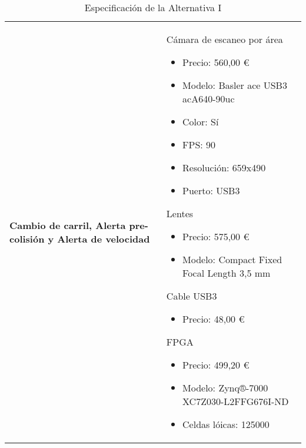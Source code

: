 \begin{table}[H]
\begin{center}
\begin{tabular}{p{5cm} p{8cm}}
\\ \hline

\textbf{Cambio de carril, Alerta pre-colisión y Alerta de velocidad} &
Cámara de escaneo por área
\begin{itemize}
    \item Precio: 560,00 \euro
    \item Modelo: Basler ace USB3 acA640-90uc
    \item Color: Sí
    \item FPS: 90
    \item Resolución: 659x490
    \item Puerto: USB3
\end{itemize}
Lentes
\begin{itemize}
    \item Precio: 575,00 \euro
    \item Modelo: Compact Fixed Focal Length 3,5 mm
\end{itemize}
Cable USB3
\begin{itemize}
    \item Precio: 48,00 \euro
\end{itemize}
FPGA
\begin{itemize}
    \item Precio: 499,20 \euro
    \item Modelo: Zynq®-7000 XC7Z030-L2FFG676I-ND
    \item Celdas lóicas: 125000
\end{itemize}




\end{tabular}
\caption{Especificación de la Alternativa I}
\label{tab:altI}
\end{center}
\end{table}
